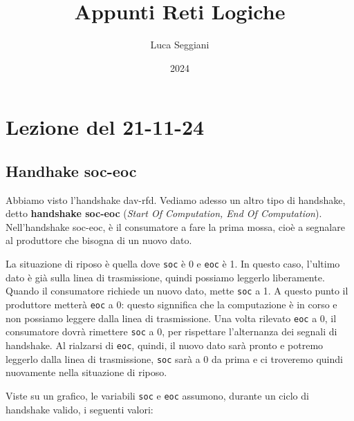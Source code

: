 \documentclass[a4paper,11pt]{article}
\title{Appunti Reti Logiche}
\author{Luca Seggiani}
\date{2024}
\begin{document}
\section{Lezione del 21-11-24}

\thispagestyle{empty}
\pagestyle{fancy}

\subsection{Handhake soc-eoc}
Abbiamo visto l'handshake dav-rfd.
Vediamo adesso un altro tipo di handshake, detto \textbf{handshake soc-eoc} (\textit{Start Of Computation, End Of Computation}).
Nell'handshake soc-eoc, è il consumatore a fare la prima mossa, cioè a segnalare al produttore che bisogna di un nuovo dato.

\par\smallskip 
La situazione di riposo è quella dove \lstinline|soc| è 0 e \lstinline|eoc| è 1.
In questo caso, l'ultimo dato è già sulla linea di trasmissione, quindi possiamo leggerlo liberamente.
Quando il consumatore richiede un nuovo dato, mette \lstinline|soc| a 1.
A questo punto il produttore metterà \lstinline|eoc| a 0: questo signnifica che la computazione è in corso e non possiamo leggere dalla linea di trasmissione.
Una volta rilevato \lstinline|eoc| a 0, il consumatore dovrà rimettere \lstinline|soc| a 0, per rispettare l'alternanza dei segnali di handshake.
Al rialzarsi di \lstinline|eoc|, quindi, il nuovo dato sarà pronto e potremo leggerlo dalla linea di trasmissione, \lstinline|soc| sarà a 0 da prima e ci troveremo quindi nuovamente nella situazione di riposo.

Viste su un grafico, le variabili \lstinline|soc| e \lstinline|eoc| assumono, durante un ciclo di handshake valido, i seguenti valori: 

\begin{center}
\end{center}
\end{document}
